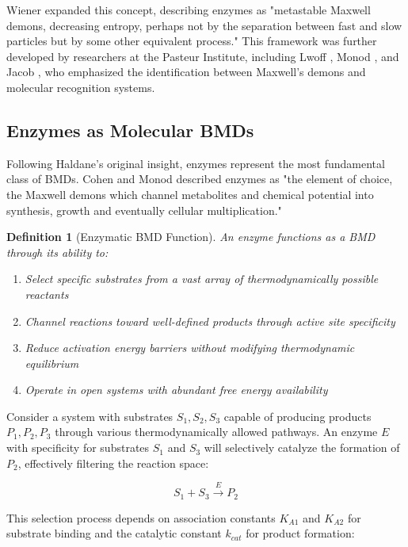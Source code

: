 \documentclass[12pt,a4paper]{article}
\newtheorem{definition}{Definition}[section]
\begin{document}
Wiener \citep{wiener1948} expanded this concept, describing enzymes as "metastable Maxwell demons, decreasing entropy, perhaps not by the separation between fast and slow particles but by some other equivalent process." This framework was further developed by researchers at the Pasteur Institute, including Lwoff \citep{lwoff1962}, Monod \citep{monod1972}, and Jacob \citep{jacob1973}, who emphasized the identification between Maxwell's demons and molecular recognition systems.

\subsection{Enzymes as Molecular BMDs}

Following Haldane's original insight, enzymes represent the most fundamental class of BMDs. Cohen and Monod \citep{cohen1957} described enzymes as "the element of choice, the Maxwell demons which channel metabolites and chemical potential into synthesis, growth and eventually cellular multiplication."

\begin{definition}[Enzymatic BMD Function]
An enzyme functions as a BMD through its ability to:
\begin{enumerate}
\item Select specific substrates from a vast array of thermodynamically possible reactants
\item Channel reactions toward well-defined products through active site specificity
\item Reduce activation energy barriers without modifying thermodynamic equilibrium
\item Operate in open systems with abundant free energy availability
\end{enumerate}
\end{definition}

Consider a system with substrates $S_1, S_2, S_3$ capable of producing products $P_1, P_2, P_3$ through various thermodynamically allowed pathways. An enzyme $E$ with specificity for substrates $S_1$ and $S_3$ will selectively catalyze the formation of $P_2$, effectively filtering the reaction space:

\begin{equation}
S_1 + S_3 \xrightarrow{E} P_2
\end{equation}

This selection process depends on association constants $K_{A1}$ and $K_{A2}$ for substrate binding and the catalytic constant $k_{cat}$ for product formation:
\end{document}
